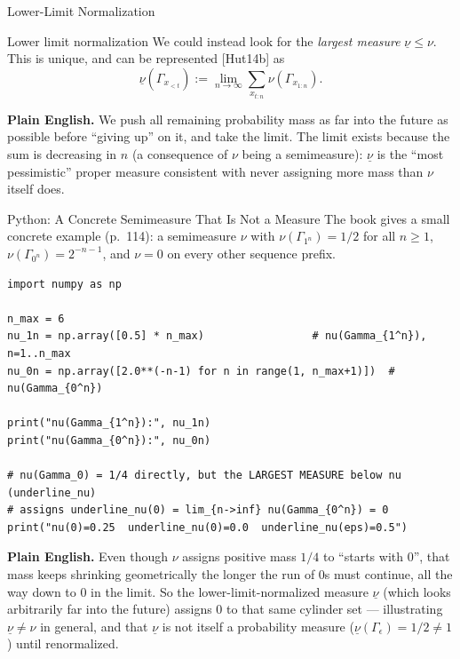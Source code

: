 \documentclass[aspectratio=169,10pt]{beamer}
\begin{document}
\begin{frame}{Lower-Limit Normalization}
  \begin{block}{Lower limit normalization}
    We could instead look for the \emph{largest measure} $\underline\nu \le
    \nu$. This is unique, and can be represented [Hut14b] as
    \[
      \underline\nu(\Gamma_{x_{<t}}) := \lim_{n\to\infty}
      \sum_{x_{t:n}} \nu(\Gamma_{x_{1:n}}).
    \]
  \end{block}
  \textbf{Plain English.} We push all remaining probability mass as far
  into the future as possible before ``giving up'' on it, and take the
  limit. The limit exists because the sum is decreasing in $n$ (a
  consequence of $\nu$ being a semimeasure): $\underline\nu$ is the
  ``most pessimistic'' proper measure consistent with never assigning more
  mass than $\nu$ itself does.
\end{frame}

\begin{frame}[fragile]{Python: A Concrete Semimeasure That Is Not a Measure}
  The book gives a small concrete example (p.\ 114): a semimeasure $\nu$
  with $\nu(\Gamma_{1^n}) = 1/2$ for all $n\ge1$, $\nu(\Gamma_{0^n}) =
  2^{-n-1}$, and $\nu = 0$ on every other sequence prefix.

\begin{lstlisting}
import numpy as np

n_max = 6
nu_1n = np.array([0.5] * n_max)                 # nu(Gamma_{1^n}), n=1..n_max
nu_0n = np.array([2.0**(-n-1) for n in range(1, n_max+1)])  # nu(Gamma_{0^n})

print("nu(Gamma_{1^n}):", nu_1n)
print("nu(Gamma_{0^n}):", nu_0n)

# nu(Gamma_0) = 1/4 directly, but the LARGEST MEASURE below nu (underline_nu)
# assigns underline_nu(0) = lim_{n->inf} nu(Gamma_{0^n}) = 0
print("nu(0)=0.25  underline_nu(0)=0.0  underline_nu(eps)=0.5")
\end{lstlisting}

  \textbf{Plain English.} Even though $\nu$ assigns positive mass $1/4$ to
  ``starts with 0'', that mass keeps shrinking geometrically the longer the
  run of 0s must continue, all the way down to $0$ in the limit. So the
  lower-limit-normalized measure $\underline\nu$ (which looks arbitrarily
  far into the future) assigns $0$ to that same cylinder set --- illustrating
  $\underline\nu \ne \nu$ in general, and that $\underline\nu$ is not itself
  a probability measure ($\underline\nu(\Gamma_\epsilon)=1/2\ne1$) until
  renormalized.
\end{frame}
\end{document}

